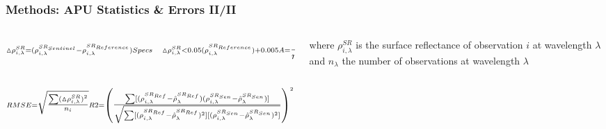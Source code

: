 \documentclass[9pt]{beamer}
\begin{document}
\begin{frame}
\frametitle{Methods: APU Statistics \& Errors II/II}
\begin{columns}
\begin{column}{0.5\textwidth}
\begin{math}
\scriptstyle \vartriangle\rho_{i,\lambda}^{SR}= (\rho_{i,\lambda}^{SR_{Sentinel}} - \rho_{i,\lambda}^{SR_{Reference}})\newline\newline
\scriptstyle Specs\quad\vartriangle\rho_{i,\lambda}^{SR} < 0.05 (\rho_{i,\lambda}^{SR_{Reference}}) + 0.005\newline\newline
\scriptstyle A = \dfrac{1}{n_\lambda}(\sum\limits_{i=1}^{n_\lambda}\vartriangle\rho_{i,\lambda}^{SR})\newline\newline
\scriptstyle P = \sqrt{\frac{1}{n_\lambda-1}\sum\limits_{i=1}^{n_\lambda}(\vartriangle\rho_{i,\lambda}^{SR}-A)^{2}}\newline\newline
\scriptstyle U = \sqrt{\frac{1}{n_\lambda}\sum\limits_{i=1}^{n_\lambda}(\vartriangle\rho_{i,\lambda}^{SR})^{2}}\newline\newline
\end{math}
\end{column}
\begin{column}{0.5\textwidth}
\newline\newline\newline\newline
where\newline
\begin{math}\scriptstyle\rho_{i,\lambda}^{SR}\end{math} is the surface reflectance of observation \begin{math}\scriptstyle i\end{math} at wavelength \begin{math}\scriptstyle\lambda\end{math} and \newline
\begin{math}\scriptstyle n_\lambda\end{math} the number of observations at wavelength \begin{math}\scriptstyle\lambda\end{math}\\
\end{column}
\end{columns}
\begin{math}
\scriptstyle RMSE = \sqrt{\tfrac{\sum(\vartriangle\rho_{i,\lambda}^{SR})^2}{n_i}}\newline\newline
\scriptstyle R2 =\left(\tfrac{\sum[(\rho_{i,\lambda}^{SR_{Ref}} - \hat{\rho}_{\lambda}^{SR_{Ref}})(\rho_{i,\lambda}^{SR_{Sen}} - \hat{\rho}_{\lambda}^{SR_{Sen}})]}{\sqrt{\sum[(\rho_{i,\lambda}^{SR_{Ref}}-\hat{\rho}_{\lambda}^{SR_{Ref}})^2][(\rho_{i,\lambda}^{SR_{Sen}}-\hat{\rho}_{\lambda}^{SR_{Sen}})^2]}}\right)^2
\end{math}
\end{frame}
\end{document}
